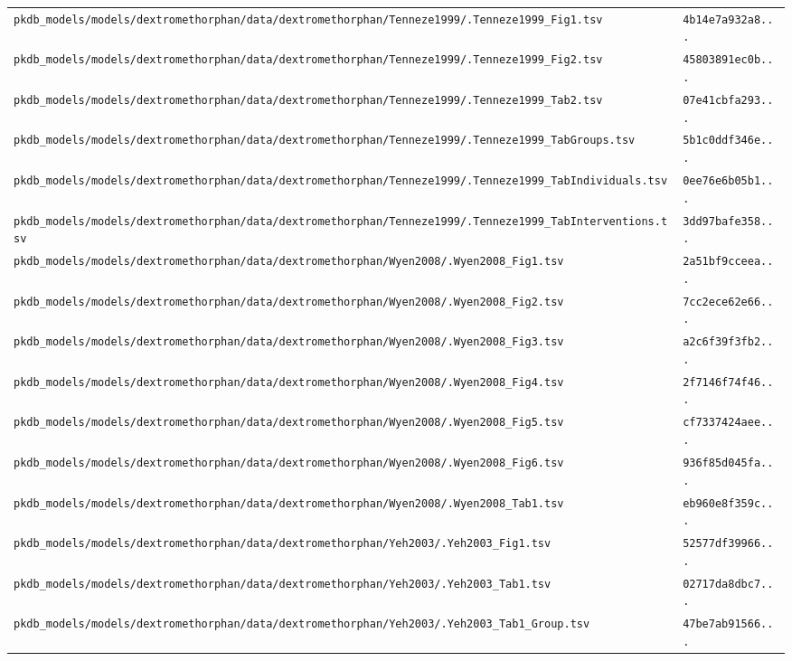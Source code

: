 \documentclass{article}
\begin{document}
\begin{longtable}{ll}
\texttt{pkdb\_models/models/dextromethorphan/data/dextromethorphan/Tenneze1999/.Tenneze1999\_Fig1.tsv} & \texttt{4b14e7a932a8...} \\
\texttt{pkdb\_models/models/dextromethorphan/data/dextromethorphan/Tenneze1999/.Tenneze1999\_Fig2.tsv} & \texttt{45803891ec0b...} \\
\texttt{pkdb\_models/models/dextromethorphan/data/dextromethorphan/Tenneze1999/.Tenneze1999\_Tab2.tsv} & \texttt{07e41cbfa293...} \\
\texttt{pkdb\_models/models/dextromethorphan/data/dextromethorphan/Tenneze1999/.Tenneze1999\_TabGroups.tsv} & \texttt{5b1c0ddf346e...} \\
\texttt{pkdb\_models/models/dextromethorphan/data/dextromethorphan/Tenneze1999/.Tenneze1999\_TabIndividuals.tsv} & \texttt{0ee76e6b05b1...} \\
\texttt{pkdb\_models/models/dextromethorphan/data/dextromethorphan/Tenneze1999/.Tenneze1999\_TabInterventions.tsv} & \texttt{3dd97bafe358...} \\
\texttt{pkdb\_models/models/dextromethorphan/data/dextromethorphan/Wyen2008/.Wyen2008\_Fig1.tsv} & \texttt{2a51bf9cceea...} \\
\texttt{pkdb\_models/models/dextromethorphan/data/dextromethorphan/Wyen2008/.Wyen2008\_Fig2.tsv} & \texttt{7cc2ece62e66...} \\
\texttt{pkdb\_models/models/dextromethorphan/data/dextromethorphan/Wyen2008/.Wyen2008\_Fig3.tsv} & \texttt{a2c6f39f3fb2...} \\
\texttt{pkdb\_models/models/dextromethorphan/data/dextromethorphan/Wyen2008/.Wyen2008\_Fig4.tsv} & \texttt{2f7146f74f46...} \\
\texttt{pkdb\_models/models/dextromethorphan/data/dextromethorphan/Wyen2008/.Wyen2008\_Fig5.tsv} & \texttt{cf7337424aee...} \\
\texttt{pkdb\_models/models/dextromethorphan/data/dextromethorphan/Wyen2008/.Wyen2008\_Fig6.tsv} & \texttt{936f85d045fa...} \\
\texttt{pkdb\_models/models/dextromethorphan/data/dextromethorphan/Wyen2008/.Wyen2008\_Tab1.tsv} & \texttt{eb960e8f359c...} \\
\texttt{pkdb\_models/models/dextromethorphan/data/dextromethorphan/Yeh2003/.Yeh2003\_Fig1.tsv} & \texttt{52577df39966...} \\
\texttt{pkdb\_models/models/dextromethorphan/data/dextromethorphan/Yeh2003/.Yeh2003\_Tab1.tsv} & \texttt{02717da8dbc7...} \\
\texttt{pkdb\_models/models/dextromethorphan/data/dextromethorphan/Yeh2003/.Yeh2003\_Tab1\_Group.tsv} & \texttt{47be7ab91566...} \\

\end{longtable}
\end{document}
